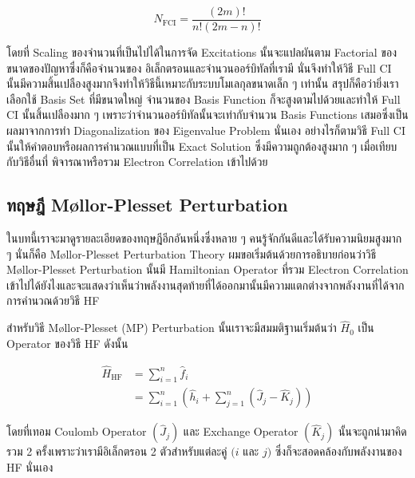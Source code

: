 \begin{equation}
  \label{eq:Full_CI}
  N_{\mathrm{FCI}}
  =
  \frac{(2 m) !}{n !(2 m-n) !}
\end{equation}

\noindent โดยที่ Scaling ของจำนวนที่เป็นไปได้ในการจัด Excitations นั้นจะแปลผันตาม Factorial ของขนาดของปัญหาซึ่งก็คือจำนวนของ%
อิเล็กตรอนและจำนวนออร์บิทัลที่เรามี นั่นจึงทำให้วิธี Full CI นั้นมีความสิ้นเปลืองสูงมากจึงทำให้วิธีนี้เหมาะกับระบบโมเลกุลขนาดเล็ก ๆ เท่านั้น
สรุปก็คือว่ายิ่งเราเลือกใช้ Basis Set ที่มีขนาดใหญ่ จำนวนของ Basis Function ก็จะสูงตามไปด้วยและทำให้ Full CI นั้นสิ้นเปลืองมาก ๆ
เพราะว่าจำนวนออร์บิทัลนั้นจะเท่ากับจำนวน Basis Functions เสมอซึ่งเป็นผลมาจากการทำ Diagonalization ของ Eigenvalue Problem
นั่นเอง อย่างไรก็ตามวิธี Full CI นั้นให้คำตอบหรือผลการคำนวณแบบที่เป็น Exact Solution ซึ่งมีความถูกต้องสูงมาก ๆ เมื่อเทียบกับวิธีอื่นที่%
พิจารณาหรือรวม Electron Correlation เข้าไปด้วย

\subsection{ทฤษฎี M\o{}llor-Plesset Perturbation}

ในบทนี้เราจะมาดูรายละเอียดของทฤษฎีอีกอันหนึ่งซึ่งหลาย ๆ คนรู้จักกันดีและได้รับความนิยมสูงมาก ๆ นั่นก็คือ M\o{}llor-Plesset Perturbation
Theory ผมขอเริ่มต้นด้วยการอธิบายก่อนว่าวิธี M\o{}llor-Plesset Perturbation นั้นมี Hamiltonian Operator ที่รวม Electron
Correlation เข้าไปได้ยังไงและจะแสดงว่าเห็นว่าพลังงานสุดท้ายที่ได้ออกมานั้นมีความแตกต่างจากพลังงานที่ได้จากการคำนวณด้วยวิธี HF

สำหรับวิธี M\o{}llor-Plesset (MP) Perturbation นั้นเราจะมีสมมติฐานเริ่มต้นว่า $\hat{H}_0$ เป็น Operator ของวิธี HF
ดังนั้น

\begin{equation}
  \begin{aligned}
    \hat{H}_{\mathrm{HF}}
     & = \sum_{i=1}^n \hat{f}_i \\
     & = \sum_{i=1}^n
    \left(
    \hat{h}_i + \sum_{j=1}^n
    \left(
      \hat{J}_j - \hat{K}_j
      \right)
    \right)
  \end{aligned}
\end{equation}

\noindent โดยที่เทอม Coulomb Operator $(\hat{J}_j)$ และ Exchange Operator $(\hat{K}_j)$
นั้นจะถูกนำมาคิดรวม 2 ครั้งเพราะว่าเรามีอิเล็กตรอน 2 ตัวสำหรับแต่ละคู่ $(i$ และ $j)$ ซึ่งก็จะสอดคล้องกับพลังงานของ HF นั่นเอง


